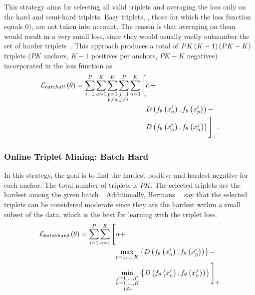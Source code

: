 This strategy aims for selecting all valid triplets and averaging the loss only on the hard and semi-hard triplets. Easy triplets, \ietext{}, those for which the loss function equals $0$), are not taken into account. The reason is that averaging on them would result in a very small loss, since they would usually vastly outnumber the set of harder triplets~\cite{hermans2017triplet}. This approach produces a total of $PK \left( {K - 1} \right) \left( {PK - K} \right)$ triplets ($PK$ anchors, $K - 1$ positives per anchors, $PK - K$ negatives) incorporated in the loss function as
\begin{equation}
    \label{eq:BatchAllLossFunction}
    \begin{aligned}
        {\mathcal{L}_{batchall}} \left( \theta \right) =
        \sum_{i = 1}^P
        \sum_{a = 1}^K
        \sum_{\substack{p = 1 \\p \neq a}}^K
        \sum_{\substack{j = 1 \\j \neq i}}^P
        \sum_{n = 1}^K
        \Bigg[
         & \alpha +           \\
         & {D} \left( 
            {f_\theta} \left( x_a^i \right),
            {f_\theta} \left( x_p^i \right)
         \right) -                   \\
         & {D} \left( 
            {f_\theta} \left( x_a^i \right),
            {f_\theta} \left( x_n^j \right)
         \right)
        {\Bigg]}_{+}.
    \end{aligned}
\end{equation}

\subsubsection{Online Triplet Mining: Batch Hard}

In this strategy, the goal is to find the hardest positive and hardest negative for each anchor. The total number of triplets is $PK$. The selected triplets are the hardest among the given batch~\cite{hermans2017triplet}. Additionally, Hermans~\etal{}~\cite{hermans2017triplet} say that the selected triplets can be considered moderate since they are the hardest within a small subset of the data, which is the best for learning with the triplet loss.
\begin{equation}
    \label{eq:BatchHardMining}
    \begin{aligned}
        {\mathcal{L}_{batchhard}} \left( \theta \right) =
        \sum_{i = 1}^P
        \sum_{a = 1}^K
        \Bigg[
         & \alpha +                            \\
         & \underset{p = 1, \dots, K} {\max}
        \left\{ {
            {D} \left( 
                {f_\theta} \left( x_a^i \right),
                {f_\theta} \left( x_p^i \right)
             \right)
        } \right\} -                                    \\
         & \underset{\substack{j = 1, \dots, P \\n = 1, \dots, K\\j \neq i}} {\min}
        \left\{ {
            {D} \left( 
                {f_\theta} \left( x_a^i \right),
                {f_\theta} \left( x_n^j \right)
             \right)
        } \right\}
        {\Bigg]}_{+}
    \end{aligned}
\end{equation}
